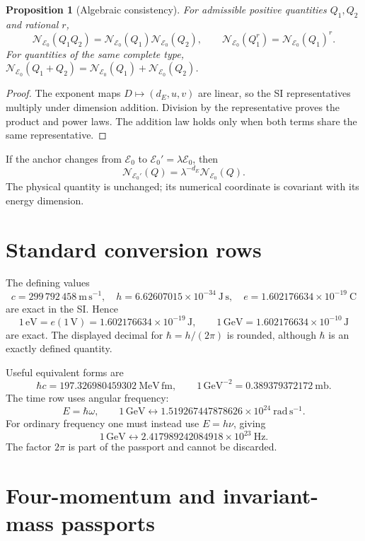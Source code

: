 \documentclass[11pt,a4paper]{article}
\theoremstyle{definition}
\theoremstyle{plain}
\newtheorem{proposition}[definition]{Proposition}
\theoremstyle{remark}
\newcommand{\Ezero}{\mathcal E_0}
\newcommand{\Nhep}{\mathcal N_{\Ezero}}
\newcommand{\GeV}{\mathrm{GeV}}
\newcommand{\MeV}{\mathrm{MeV}}
\begin{document}
\begin{proposition}[Algebraic consistency]
For admissible positive quantities \(Q_1,Q_2\) and rational \(r\),
\[
\Nhep(Q_1Q_2)=\Nhep(Q_1)\Nhep(Q_2),\qquad
\Nhep(Q_1^r)=\Nhep(Q_1)^r.
\]
For quantities of the same complete type,
\(\Nhep(Q_1+Q_2)=\Nhep(Q_1)+\Nhep(Q_2)\).
\end{proposition}

\begin{proof}
The exponent maps \(D\mapsto(d_E,u,v)\) are linear, so the SI
representatives multiply under dimension addition. Division by the
representative proves the product and power laws. The addition law
holds only when both terms share the same representative.
\end{proof}

If the anchor changes from \(\Ezero\) to
\(\Ezero'=\lambda\Ezero\), then
\[
\mathcal N_{\Ezero'}(Q)=\lambda^{-d_E}\mathcal N_{\Ezero}(Q).
\]
The physical quantity is unchanged; its numerical coordinate is
covariant with its energy dimension.

\section{Standard conversion rows}

The defining values
\[
c=299\,792\,458\ \mathrm{m\,s^{-1}},\quad
h=6.62607015\times10^{-34}\ \mathrm{J\,s},\quad
e=1.602176634\times10^{-19}\ \mathrm C
\]
are exact in the SI. Hence
\[
1\,\mathrm{eV}=e(1\,\mathrm V)
=1.602176634\times10^{-19}\,\mathrm J,
\qquad
1\,\GeV=1.602176634\times10^{-10}\,\mathrm J
\]
are exact.
The displayed decimal for \(\hbar=h/(2\pi)\) is rounded, although
\(\hbar\) is an exactly defined quantity.

\begin{center}
\small

\end{center}

Useful equivalent forms are
\[
\hbar c=197.326980459302\ \MeV\,\mathrm{fm},
\qquad
1\,\GeV^{-2}=0.389379372172\ \mathrm{mb}.
\]
The time row uses angular frequency:
\[
E=\hbar\omega,\qquad
1\,\GeV\longleftrightarrow
1.519267447878626\times10^{24}\ \mathrm{rad\,s^{-1}}.
\]
For ordinary frequency one must instead use
\(E=h\nu\), giving
\[
1\,\GeV\longleftrightarrow
2.417989242084918\times10^{23}\ \mathrm{Hz}.
\]
The factor \(2\pi\) is part of the passport and cannot be discarded.

\section{Four-momentum and invariant-mass passports}
\end{document}
